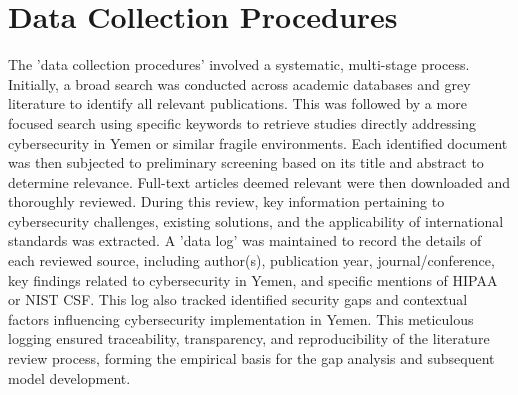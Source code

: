 \documentclass[12pt, a4paper, oneside]{report}
\begin{document}
	\section{Data Collection Procedures}
	The 'data collection procedures' involved a systematic, multi-stage process. Initially, a broad search was conducted across academic databases and grey literature to identify all relevant publications. This was followed by a more focused search using specific keywords to retrieve studies directly addressing cybersecurity in Yemen or similar fragile environments. Each identified document was then subjected to preliminary screening based on its title and abstract to determine relevance. Full-text articles deemed relevant were then downloaded and thoroughly reviewed. During this review, key information pertaining to cybersecurity challenges, existing solutions, and the applicability of international standards was extracted. A 'data log' was maintained to record the details of each reviewed source, including author(s), publication year, journal/conference, key findings related to cybersecurity in Yemen, and specific mentions of HIPAA or NIST CSF. This log also tracked identified security gaps and contextual factors influencing cybersecurity implementation in Yemen. This meticulous logging ensured traceability, transparency, and reproducibility of the literature review process, forming the empirical basis for the gap analysis and subsequent model development.
	
\end{document}
